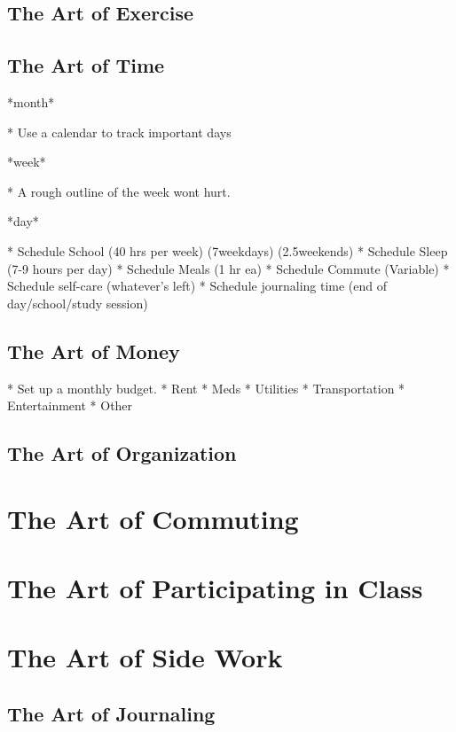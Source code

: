 \documentclass{book}
\begin{document}
\section{The Art of Exercise}

\section{The Art of Time}

*month*

* Use a calendar to track important days

*week*

* A rough outline of the week wont hurt. 

*day*

* Schedule School (40 hrs per week) (7weekdays) (2.5weekends)
* Schedule Sleep  (7-9 hours per day)
* Schedule Meals  (1 hr ea)
* Schedule Commute (Variable)
* Schedule self-care (whatever's left)
* Schedule journaling time (end of day/school/study session)

\section{The Art of Money}

* Set up a monthly budget. 
* Rent
* Meds
* Utilities
* Transportation
* Entertainment
* Other

\section{The Art of Organization}

\chapter{The Art of Commuting}

\chapter{The Art of Participating in Class}

\chapter{The Art of Side Work}

\section{The Art of Journaling}
\end{document}
